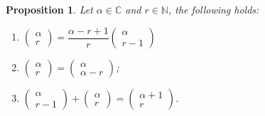 \documentclass[12pt]{article}
\newtheorem*{proposition}{Proposition}
\begin{document}
    \begin{proposition}
        Let $\alpha\in\mathbb{C}$ and $r\in\mathbb{N}$, the following holds:
        \begin{enumerate}
            \item $\begin{pmatrix}
                \alpha\\r
            \end{pmatrix}=\dfrac{\alpha-r+1}{r}\begin{pmatrix}
                \alpha\\r-1
            \end{pmatrix}$
            \item $\begin{pmatrix}
                \alpha\\r
            \end{pmatrix}=\begin{pmatrix}
                \alpha\\\alpha-r
            \end{pmatrix}$;
            \item $\begin{pmatrix}
                \alpha\\r-1
            \end{pmatrix}+\begin{pmatrix}
                \alpha\\r
            \end{pmatrix}=\begin{pmatrix}
                \alpha+1\\r
            \end{pmatrix}$.
        \end{enumerate}
    \end{proposition}
\end{document}
